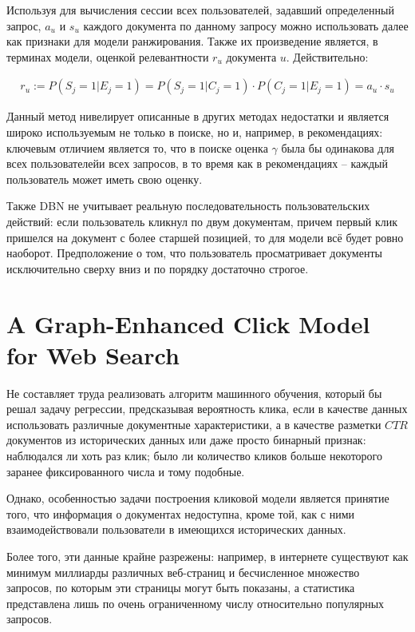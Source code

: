 \documentclass[diploma]{nanolab2015}
\begin{document}
Используя для вычисления сессии всех пользователей, задавший определенный запрос, $a_u$ и $s_u$ каждого документа по данному запросу можно использовать далее как признаки для модели ранжирования. Также их произведение является, в терминах модели, оценкой релевантности $r_u$ документа $u$. Действительно:

\begin{align}
  r_u := P(S_j=1 | E_j = 1) = P(S_j = 1 | C_j = 1) \cdot P(C_j = 1 | E_j = 1) = a_u \cdot s_u
\end{align}

Данный метод нивелирует описанные в других методах недостатки и является широко используемым не только в поиске, но и, например, в рекомендациях: ключевым отличием является то, что в поиске оценка $\gamma$ была бы одинакова для всех пользователейи всех запросов, в то время как в рекомендациях -- каждый пользователь может иметь свою оценку.

Также DBN не учитывает реальную последовательность пользовательских действий: если пользователь кликнул по двум документам, причем первый клик пришелся на документ с более старшей позицией, то для модели всё будет ровно наоборот. Предположение о том, что пользователь просматривает документы исключительно сверху вниз и по порядку достаточно строгое.

\section{A Graph-Enhanced Click Model for Web Search}
Не составляет труда реализовать алгоритм машинного обучения, который бы решал задачу регрессии, предсказывая вероятность клика, если в качестве данных использовать различные документные характеристики, а в качестве разметки $CTR$ документов из исторических данных или даже просто бинарный признак: наблюдался ли хоть раз клик; было ли количество кликов больше некоторого заранее фиксированного числа и тому подобные.

Однако, особенностью задачи построения кликовой модели является принятие того, что информация о документах недоступна, кроме той, как с ними взаимодействовали пользователи в имеющихся исторических данных.

Более того, эти данные крайне разрежены: например, в интернете существуют как минимум миллиарды различных веб-страниц и бесчисленное множество запросов, по которым эти страницы могут быть показаны, а статистика представлена лишь по очень ограниченному числу относительно популярных запросов.
\end{document}
